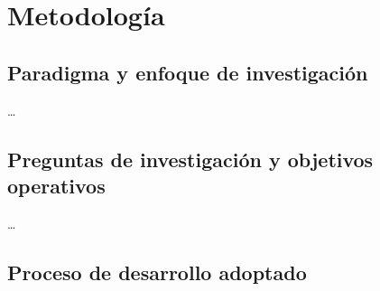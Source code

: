 \chapter{Metodología}
\label{ch:metodologia}


\section{Paradigma y enfoque de investigación}
\label{sec:enfoque}

\ldots

\section{Preguntas de investigación y objetivos operativos}
\label{sec:preguntas_investigacion}

\ldots

\section{Proceso de desarrollo adoptado}
\label{sec:proceso_desarrollo}

